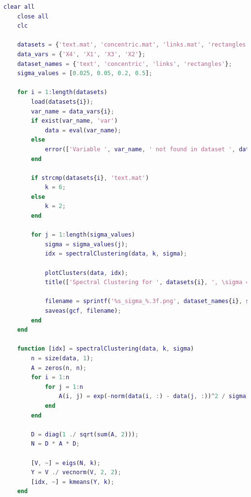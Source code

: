 \documentclass[11pt]{article}
\begin{document}
\begin{lstlisting}[language = matlab]
    clear all
    close all
    clc

    datasets = {'text.mat', 'concentric.mat', 'links.mat', 'rectangles.mat'};
    data_vars = {'X4', 'X1', 'X3', 'X2'};
    dataset_names = {'text', 'concentric', 'links', 'rectangles'}; 
    sigma_values = [0.025, 0.05, 0.2, 0.5];

    for i = 1:length(datasets)
        load(datasets{i});
        var_name = data_vars{i};
        if exist(var_name, 'var')
            data = eval(var_name); 
        else
            error(['Variable ', var_name, ' not found in dataset ', datasets{i}]);
        end

        if strcmp(datasets{i}, 'text.mat')
            k = 6; 
        else
            k = 2; 
        end

        for j = 1:length(sigma_values)
            sigma = sigma_values(j);
            idx = spectralClustering(data, k, sigma);
    
            plotClusters(data, idx);
            title(['Spectral Clustering for ', datasets{i}, ', \sigma = ', num2str(sigma)]);
            
            filename = sprintf('%s_sigma_%.3f.png', dataset_names{i}, sigma);
            saveas(gcf, filename);
        end
    end

    function [idx] = spectralClustering(data, k, sigma)
        n = size(data, 1);
        A = zeros(n, n);
        for i = 1:n
            for j = 1:n
                A(i, j) = exp(-norm(data(i, :) - data(j, :))^2 / sigma);
            end
        end

        D = diag(1 ./ sqrt(sum(A, 2)));
        N = D * A * D; 

        [V, ~] = eigs(N, k);
        Y = V ./ vecnorm(V, 2, 2);
        [idx, ~] = kmeans(Y, k);
    end

\end{lstlisting}
\end{document}

